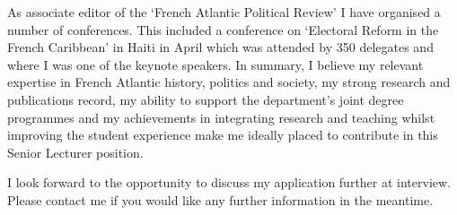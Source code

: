 \documentclass[]{cv} %
\begin{document}
As associate editor of the ‘French Atlantic Political Review’ I have
organised a number of conferences. This included a conference on
‘Electoral Reform in the French Caribbean’ in Haiti in April which was
attended by 350 delegates and where I was one of the keynote speakers.
In summary, I believe my relevant expertise in French Atlantic history,
politics and society, my strong research and publications record, my
ability to support the department’s joint degree programmes and my
achievements in integrating research and teaching whilst improving the
student experience make me ideally placed to contribute in this Senior
Lecturer position.

I look forward to the opportunity to discuss my application further at
interview. Please contact me if you would like any further information
in the meantime.
\end{document}
